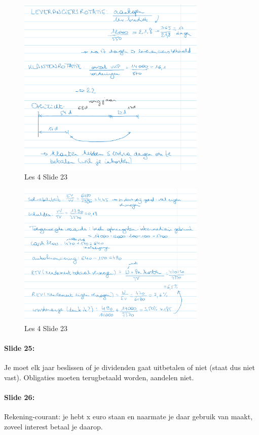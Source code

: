 \documentclass[10pt,a4paper]{report}
\begin{document}
\begin{figure}[h!]
\centering
\includegraphics[width=90mm]{Les04_05.png}
\caption{Les 4 Slide 23} 
\label{les04_05}
\end{figure}

\begin{figure}[h!]
\centering
\includegraphics[width=90mm]{Les04_06.png}
\caption{Les 4 Slide 23} 
\label{les04_06}
\end{figure}

\paragraph{Slide 25:} Je moet elk jaar beslissen of je dividenden gaat uitbetalen of niet (staat dus niet vast). Obligaties moeten terugbetaald worden, aandelen niet.

\paragraph{Slide 26:} Rekening-courant: je hebt x euro staan en naarmate je daar gebruik van maakt, zoveel interest betaal je daarop.
\end{document}
